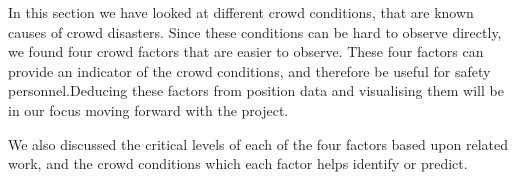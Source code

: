 In this section we have looked at different crowd conditions, that are known causes of crowd disasters. Since these conditions can be hard to observe directly, we found four crowd factors that are easier to observe. These four factors can provide an indicator of the crowd conditions, and therefore be useful for safety personnel.Deducing these factors from position data and visualising them will be in our focus moving forward with the project.

We also discussed the critical levels of each of the four factors based upon related work, and the crowd conditions which each factor helps identify or predict.